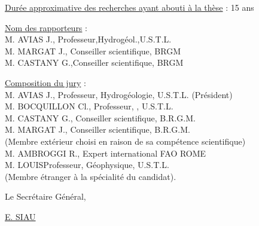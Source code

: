 \uline{Durée approximative des recherches ayant abouti à la thèse} : 15 ans

\uline{Nom des rapporteurs} :\\
M. AVIAS J., Professeur,Hydrogéol.,U.S.T.L.\\
M. MARGAT J., Conseiller scientifique, BRGM\\
M. CASTANY G.,Conseiller scientifique, BRGM


\uline{Composition du jury} :\\
M. AVIAS J., Professeur, Hydrogéologie, U.S.T.L. (Président)\\
M. BOCQUILLON Cl., Professeur, , U.S.T.L.\\
M. CASTANY G., Conseiller scientifique, B.R.G.M.\\
M. MARGAT J., Conseiller scientifique, B.R.G.M.\\
(Membre extérieur choisi en raison de sa compétence scientifique)\\
M. AMBROGGI R., Expert international FAO ROME\\
M. LOUIS\qquad Professeur, Géophysique, U.S.T.L.\\
(Membre étranger à la spécialité du candidat).


Le Secrétaire Général,


\uline{E. SIAU}

